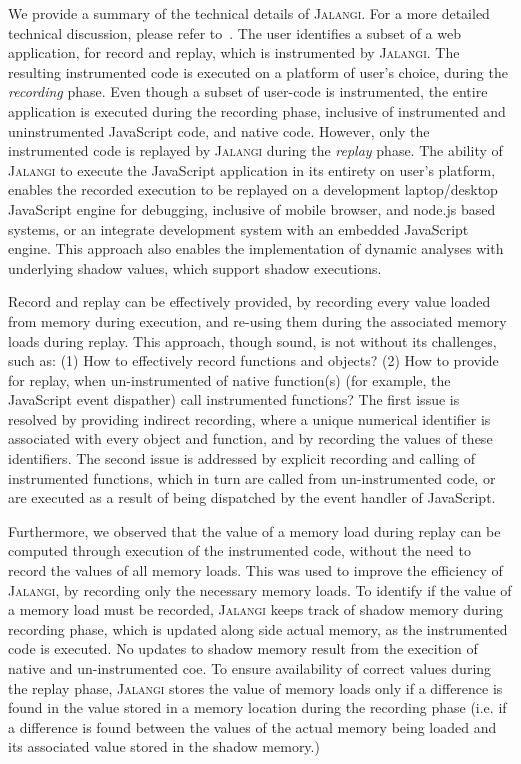 \documentclass{sig-alternate}
\def\jalangi{\textsc{Jalangi}}
\begin{document}
We provide a summary of the technical details of \jalangi{}.  For a 
more detailed technical discussion, please refer to~\cite{SBGKfse13}.
The user identifies a subset of a web application, for record and
replay, which is instrumented by \jalangi{}. The resulting instrumented
code is executed on a platform of user's choice, during the 
\emph{recording} phase.  Even though a subset of user-code is 
instrumented, the entire application is executed during the recording
phase, inclusive of instrumented and uninstrumented JavaScript code, 
and native code. However, only the instrumented code is replayed 
by \jalangi{} during the \emph{replay} phase.  The ability of \jalangi{}
to execute the JavaScript application in its entirety on user's 
platform, enables the recorded execution to be replayed on a development
laptop/desktop JavaScript engine for debugging, inclusive of mobile browser,
and node.js based systems, or an integrate development system with an
embedded JavaScript engine.  This approach also enables the implementation
of dynamic analyses with underlying shadow values, which support shadow
executions.  

Record and replay can be effectively provided, by recording every
value loaded from memory during execution, and re-using them during
the associated memory loads during replay.  This approach, though
sound, is not without its challenges, such as: (1) How to effectively
record functions and objects? (2) How to provide for replay, when
un-instrumented of native function(s) (for example, the JavaScript
event dispather) call instrumented functions?  The first issue is
resolved by providing indirect recording, where a unique numerical
identifier is associated with every object and function, and by
recording the values of these identifiers.  The second issue is
addressed by explicit recording and calling of instrumented functions,
which in turn are called from un-instrumented code, or are executed as
a result of being dispatched by the event handler of JavaScript.

Furthermore, we observed that the value of a memory load during replay
can be computed through execution of the instrumented code, without
the need to record the values of all memory loads.  This was used to
improve the efficiency of \jalangi{}, by recording only the necessary
memory loads.  To identify if the value of a memory load must be
recorded, \jalangi{} keeps track of shadow memory during recording
phase, which is updated along side actual memory, as the instrumented
code is executed.  No updates to shadow memory result from the
execition of native and un-instrumented coe.  To ensure availability
of correct values during the replay phase, \jalangi{} stores the value
of memory loads only if a difference is found in the value stored in a
memory location during the recording phase (i.e. if a difference is
found between the values of the actual memory being loaded and its
associated value stored in the shadow memory.)
\end{document}
